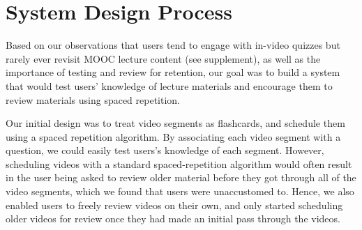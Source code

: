 \documentclass{sigchi}
\begin{document}



\section{System Design Process}

Based on our observations that users tend to engage with in-video quizzes but rarely ever revisit MOOC lecture content (see supplement), as well as the importance of testing and review for retention, our goal was to build a system that would test users' knowledge of lecture materials and encourage them to review materials using spaced repetition.


Our initial design was to treat video segments as flashcards, and schedule them using a spaced repetition algorithm. By associating each video segment with a question, we could easily test users's knowledge of each segment. However, scheduling videos with a standard spaced-repetition algorithm would often result in the user being asked to review older material before they got through all of the video segments, which we found that users were unaccustomed to. Hence, we also enabled users to freely review videos on their own, and only started scheduling older videos for review once they had made an initial pass through the videos. %
\end{document}
